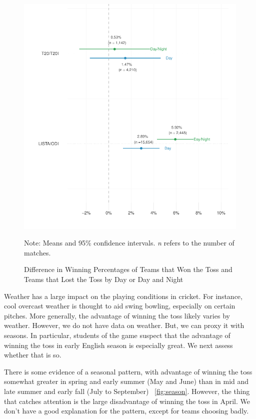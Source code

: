 \documentclass[12pt]{article}
\begin{document}
\begin{figure}[htbp]
\centering
\caption{Difference in Winning Percentages of Teams that Won the Toss and Teams that Lost the Toss by Day or Day and Night}
\includegraphics[scale=.85]{../figs/winbyDayNight.pdf}
{\footnotesize Note: Means and 95\% confidence intervals. \emph{n} refers to the number of matches.\par}
\label{fig:dn}
\end{figure}

Weather has a large impact on the playing conditions in cricket. For instance, cool overcast weather is thought to aid swing bowling, especially on certain pitches. More generally, the advantage of winning the toss likely varies by weather. However, we do not have data on weather. But, we can proxy it with seasons. In particular, students of the game suspect that the advantage of winning the toss in early English season is especially great. We next assess whether that is so.

There is some evidence of a seasonal pattern, with advantage of winning the toss somewhat greater in spring and early summer (May and June) than in mid and late summer and early fall (July to September) ~\ref{fig:season}. However, the thing that catches attention is the large disadvantage of winning the toss in April. We don't have a good explanation for the pattern, except for teams choosing badly.  
\end{document}
